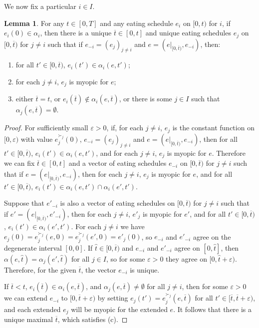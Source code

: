 \documentclass[12pt, A4paper]{article}
\theoremstyle{definition}
\newtheorem{lem}{Lemma}
\newcommand{\hatt}{{\hat t}}
\newcommand{\bart}{{\overline t}}
\newcommand{\varep}{\varepsilon}
\begin{document}
\begin{appendix}
We now fix a particular $i \in I$.

\begin{lem} \label{lemma:ExtendEatBound}
  For any $t \in [0,T]$ and any eating schedule $e_i$ on $[0,t)$ for $i$, if $e_i(0) \in \alpha_i$, then there is a unique $\bart \in [0,t]$ and  unique eating schedules $e_j$ on $[0,\bart)$ for $j \ne i$ such that if $e_{-i} = (e_j)_{j \ne i}$ and $e = (e|_{[0,\bart)}, e_{-i})$, then:
  \begin{enumerate}
    \item[(a)] for all $t' \in [0,\bart)$, $e_i(t') \in \alpha_i(e,t')$;
    \item[(b)] for each $j \ne i$, $e_j$ is myopic for $e$;
    \item[(c)] either $\bart = t$, or $e_i(\bart) \notin \alpha_i(e,\bart)$, or there is some $j \in I$ such that $\alpha_j(e,\bart) = \emptyset$.
  \end{enumerate}
\end{lem}

\begin{proof}
  For sufficiently small $\varep > 0$, if, for each $j \ne i$, $e_j$ is the constant function on $[0,\varep)$ with value $e^{\succ_j}_j(0)$, $e_{-i} = (e_j)_{j \ne i}$ and $e = (e|_{[0,\bart)}, e_{-i})$, then for all $t' \in [0,\bart)$, $e_i(t') \in \alpha_i(e,t')$, and for each $j \ne i$, $e_j$ is myopic for $e$.  Therefore we can fix $\bart \in [0,t]$ and a vector of eating schedules $e_{-i}$ on $[0,\bart)$ for $j \ne i$ such that if $e = (e|_{[0,\bart)}, e_{-i})$, then for each $j \ne i$, $e_j$ is myopic for $e$, and for all $t' \in [0,\bart)$, $e_i(t') \in \alpha_i(e,t') \cap \alpha_i(e',t')$.

  Suppose that $e'_{-i}$ is also a vector of eating schedules on $[0,\bart)$ for $j \ne i$ such that if $e' = (e|_{[0,\bart)}, e'_{-i})$, then for each $j \ne i$, $e'_j$ is myopic for $e'$, and for all $t' \in [0,\bart)$, $e_i(t') \in \alpha_i(e',t')$.  For each $j \ne i$ we have $e_j(0) = e_j^{\succ_j}(e,0) = e_j^{\succ_j}(e',0) = e'_j(0)$, so $e_{-i}$ and $e'_{-i}$ agree on the degenerate interval $[0,0]$.  If $\hatt \in [0,\bart)$ and $e_{-i}$ and $e'_{-i}$ agree on $[0,\hatt]$, then $\alpha(e,\hatt) = \alpha_j(e',\hatt)$ for all $j \in I$, so for some $\varep > 0$ they agree on $[0,\hatt + \varep)$.  Therefore, for the given $\bart$, the vector $e_{-i}$ is unique.

  If $\bart < t$, $e_i(\bart) \in \alpha_i(e,\bart)$, and $\alpha_j(e,\bart) \ne \emptyset$ for all $j \ne i$, then for some $\varep > 0$ we can extend $e_{-i}$ to $[0,\bart + \varep)$ by setting $e_j(t') = e^{\succ_j}_j(e,\bart)$ for all $t' \in [\bart,\bart+\varep)$, and each extended $e_j$ will be myopic for the extended $e$.  It follows that there is a unique maximal $\bart$, which satisfies (c).
\end{proof}


\end{appendix}
\end{document}
